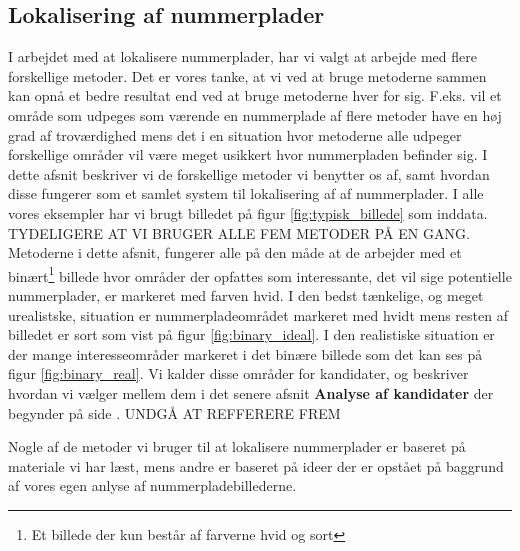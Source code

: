 \label{sec_billed}

\subsection{Lokalisering af nummerplader}

I arbejdet med at lokalisere nummerplader, har vi valgt at arbejde med flere forskellige metoder. Det er vores tanke, at vi ved at bruge metoderne sammen kan opnå et bedre resultat end ved at bruge metoderne hver for sig. F.eks. vil et område som udpeges som værende en nummerplade af flere metoder have en høj grad af troværdighed mens det i en situation hvor metoderne alle udpeger forskellige områder vil være meget usikkert hvor nummerpladen befinder sig. I dette afsnit beskriver vi de forskellige metoder vi benytter os af, samt hvordan disse fungerer som et samlet system til lokalisering af af nummerplader. I alle vores eksempler har vi brugt billedet på figur \vref{fig:typisk_billede} som inddata.
TYDELIGERE AT VI BRUGER ALLE FEM METODER PÅ EN GANG.
Metoderne i dette afsnit, fungerer alle på den måde at de arbejder med et binært\footnote{Et billede der kun består af farverne hvid og sort} billede hvor områder der opfattes som interessante, det vil sige potentielle nummerplader, er markeret med farven hvid. I den bedst tænkelige, og meget urealistske, situation er nummerpladeområdet markeret med hvidt mens resten af billedet er sort som vist på figur \vref{fig:binary_ideal}. I den realistiske situation er der mange interesseområder markeret i det binære billede som det kan ses på figur \vref{fig:binary_real}. Vi kalder disse områder for kandidater, og beskriver hvordan vi vælger mellem dem i det senere afsnit \textbf{Analyse af kandidater} der begynder på side \pageref{sec:BinImgCleanup}. UNDGÅ AT REFFERERE FREM 

Nogle af de metoder vi bruger til at lokalisere nummerplader er baseret på materiale vi har læst, mens andre er baseret på ideer der er opstået på baggrund af vores egen anlyse af nummerpladebillederne.



